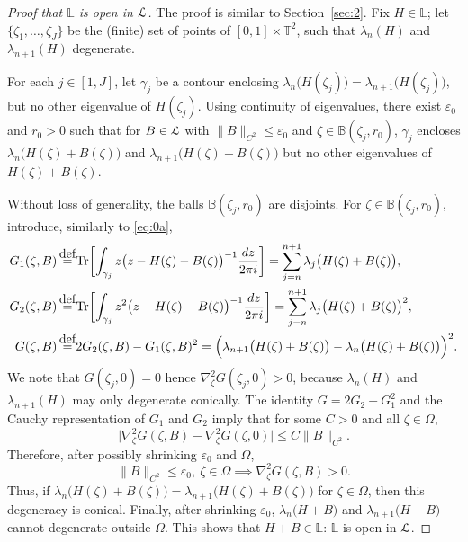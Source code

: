 \documentclass[11pt]{article}
\numberwithin{equation}{section}
\let\pazocal\EuScript
\theoremstyle{definition}
\DeclareMathOperator{\Tr}{Tr}
\newcommand{\LL}{{\pazocal{L}}}
\newcommand{\Bb}{\mathbb{B}}
\newcommand{\Ll}{\mathbb{L}}
\newcommand{\Tt}{{\mathbb{T}}}
\let\epsi\varepsilon
\newcommand{\de}{\,\mathrel{\stackrel{\makebox[0pt]{\mbox{\normalfont\tiny def}}}{=}}}
\begin{document}
\begin{proof}[Proof that $\Ll$ is open in $\LL$] The proof is similar to Section~\ref{sec:2}. Fix $H \in \Ll$; let $\{ \zeta_1, \dots, \zeta_J\}$ be the (finite) set of points of $[0,1] \times \Tt^2$, such that $\lambda_n(H)$ and $\lambda_{n+1}(H)$ degenerate.

For each $j \in [1,J]$, let $\gamma_j$ be a contour enclosing $\lambda_n\bigl(H(\zeta_j)\bigr) = \lambda_{n+1}\bigl(H(\zeta_j)\bigr)$, but no other eigenvalue of $H(\zeta_j)$. Using continuity of eigenvalues, there exist $\epsi_0$ and $r_0 > 0$ such that for $B \in \LL$ with $\| B \|_{C^2} \leq \epsi_0$ and $\zeta \in \Bb(\zeta_j,r_0)$, $\gamma_j$ encloses
$\lambda_n\bigl(H(\zeta) + B(\zeta)\bigr)$ and $\lambda_{n+1}\bigl(H(\zeta) + B(\zeta)\bigr)$ but no other eigenvalues of $H(\zeta) + B(\zeta)$.

Without loss of generality, the balls $\Bb(\zeta_j,r_0)$ are disjoints. For $\zeta \in \Bb(\zeta_j,r_0)$, introduce, similarly to \eqref{eq:0a},
\[
\begin{split}
G_1(\zeta,B) &\de \Tr \biggl[ \int_{\gamma_j} z \bigl(z-H(\zeta)-B(\zeta)\bigr)^{-1} \dfrac{dz}{2\pi i} \biggr] = \sum_{j = n}^{n+1}\lambda_j\bigl(H(\zeta)+B(\zeta)\bigr),
\\
G_2(\zeta,B) &\de \Tr \biggl[ \int_{\gamma_j} z^2 \bigl(z-H(\zeta)-B(\zeta)\bigr)^{-1} \dfrac{dz}{2\pi i} \biggr] = \sum_{j = n}^{n+1} \lambda_j\bigl(H(\zeta)+B(\zeta)\bigr)^2,
\\
G(\zeta,B) &\de 2G_2(\zeta,B) - G_1(\zeta,B)^2 = \Bigl(\lambda_{n+1}\bigl(H(\zeta)+B(\zeta)\bigr) - \lambda_n\bigl(H(\zeta)+B(\zeta)\bigr)\Bigr)^2.
\end{split}
\]
We note that $G(\zeta_j,0) = 0$ hence $\nabla^2_\zeta G(\zeta_j,0) > 0$, because $\lambda_n(H)$ and $\lambda_{n+1}(H)$ may only degenerate conically. The identity $G = 2G_2-G_1^2$ and the Cauchy representation of $G_1$ and $G_2$ imply that for some $C > 0$ and all $\zeta \in \Omega$,
\begin{equation*}
\big| \nabla^2_\zeta G(\zeta,B) - \nabla^2_\zeta G(\zeta,0) \big| \leq C \| B \|_{C^2}.
\end{equation*}
Therefore, after possibly shrinking $\epsi_0$ and $\Omega$,
\begin{equation*}
\| B \|_{C^2} \leq \epsi_0, \ \zeta \in \Omega \implies \nabla^2_\zeta G(\zeta,B) > 0.
\end{equation*}
Thus, if $\lambda_n\bigl(H(\zeta) + B(\zeta)\bigr) = \lambda_{n+1}\bigl(H(\zeta) + B(\zeta)\bigr)$ for $\zeta\in \Omega$, then this degeneracy is conical. Finally, after shrinking $\epsi_0$, $\lambda_n\bigl(H + B\bigr)$ and $\lambda_{n+1}\bigl(H + B\bigr)$ cannot degenerate outside $\Omega$. This shows that $H+B \in \Ll$: $\Ll$ is open in $\LL$.
\end{proof}
\end{document}

